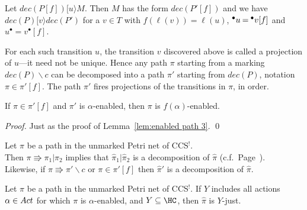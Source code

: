 \documentclass[smallcondensed]{svjour3}
\def\postcond#1{{#1}^\bullet}
\newcommand{\Lem}[1]{Lemma~\ref{lem:#1}}
\begin{document}
\begin{observation}\label{obs:decompose relabelling}\rm
Let $dec(P[f])\mathrel{[u\rangle} M$.
Then $M$ has the form $dec(P'[f])$ and we have
$dec(P)\mathrel{[v\rangle} dec(P')$ for a $v\mathbin\in T$ with $f(\ell(v))\mathbin=\ell(u)$,
$\precond{u}\mathbin=\precond{v}[f]$ and $\postcond{u}\mathbin=\postcond{v}[f]$.
\end{observation}
For each such transition $u$, the transition $v$ discovered above is called a projection of $u$---it
need not be unique.
Hence any path $\pi$ starting from a marking $dec(P)\backslash c$ can be decomposed into a 
path $\pi'$ starting from $dec(P)$, notation $\pi\in \pi'[f]$. 
The path $\pi'$ fires projections of the transitions in $\pi$, in order.

\begin{lemma}\label{lem:enabled path 4}
If $ \pi \in  \pi'[f]$ and $\pi'$ is $\alpha$-enabled, then $\pi$ is $f(\alpha)$-enabled.
\end{lemma}
\begin{proof}
Just as the proof of \Lem{enabled path 3}.
\qed
\end{proof}

\begin{observation}\label{obs:decompose projection}\rm
Let $\pi$ be a path in the unmarked Petri net of CCS$^!$.\\
Then $\pi\Rrightarrow\pi_1|\pi_2$ implies 
{that  $\widehat\pi_1|\widehat\pi_2$ is a decomposition of $\widehat\pi$ (c.f.\ Page~\hyperlink{hr:decomp}{\pageref*{pg:decomp}})}.
\\
Likewise, if $\pi\Rrightarrow\pi'\backslash c$ or $\pi\in\pi'[f]$ then $\widehat\pi'$ is a
decomposition of $\widehat\pi$.
\end{observation}

\begin{proposition}\label{prop:enabled just}
Let $\pi$ be a path in the unmarked Petri net of CCS$^!$.
If $Y$ includes all actions $\alpha\in Act$ for which $\pi$ is $\alpha$-enabled, and $Y\subseteq\HC$,
then $\widehat\pi$ is $Y\!$-just.
\end{proposition}
\end{document}
